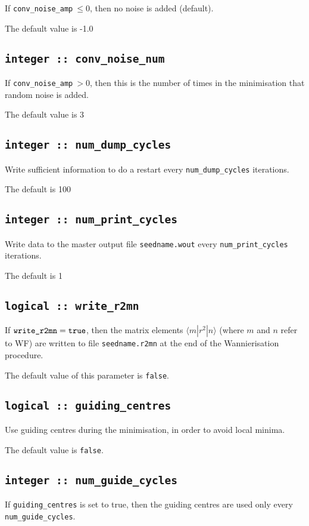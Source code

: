 If {\tt conv\_noise\_amp}$\:\leq 0$, then no noise is added (default).

The default value is -1.0

\subsection[conv\_noise\_num]{\tt integer :: conv\_noise\_num}

If {\tt conv\_noise\_amp}$\:>0$, then this is the number of times in the
minimisation that random noise is added.

The default value is 3

\subsection[num\_dump\_cycles]{\tt integer :: num\_dump\_cycles}
Write sufficient information to do a restart every
\verb#num_dump_cycles# iterations.

The default is 100

\subsection[num\_print\_cycles]{\tt integer :: num\_print\_cycles}
Write data to the master output file {\tt seedname.wout} every
\verb#num_print_cycles# iterations.

The default is 1

\subsection[write\_r2mn]{\tt logical :: write\_r2mn}

If $\verb#write_r2mn#=\verb#true#$, then the matrix elements
$\langle m|r^2|n\rangle$ (where $m$ and $n$ refer to WF) are written 
to file \verb#seedname.r2mn# at the end of the Wannierisation
procedure. 

The default value of this parameter is \verb#false#.


\subsection[guiding\_centres]{\tt logical :: guiding\_centres}
Use guiding centres during the minimisation, in order to avoid
local minima.

The default value is \verb#false#.

\subsection[num\_guide\_cycles]{\tt integer :: num\_guide\_cycles}
If \verb#guiding_centres# is set to true, then the
guiding centres are used only every \verb#num_guide_cycles#.

